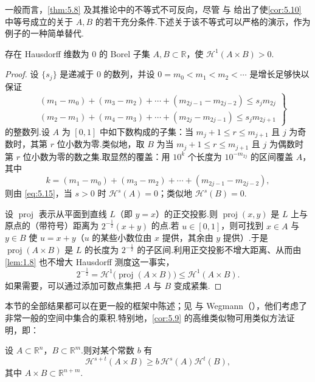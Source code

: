 一般而言，\cref{thm:5.8} 及其推论中的不等式不可反向，尽管 \textcite{besicovitchmoran1945} 与 \textcite{taylor1952} 给出了使\cref{cor:5.10} 中等号成立的关于 $A,B$ 的若干充分条件.下述关于该不等式可以严格的演示，作为 \textcite{besicovitchmoran1945} 例子的一种简单替代.

\begin{theorem}\label{thm:5.11}
存在 Hausdorff 维数为 $0$ 的 Borel 子集 $A,B\subset\mathbb{R}$，使 $\mathcal{H}^1(A\times B)>0$.
\end{theorem}

\begin{proof}
设 $\{s_j\}$ 是递减于 $0$ 的数列，并设 $0=m_0<m_1<m_2<\cdots$ 是增长足够快以保证
\begin{equation}\label{eq:5.15}
  \left.
  \begin{aligned}
    &(m_1-m_0)+(m_3-m_2)+\cdots+(m_{2j-1}-m_{2j-2})\leq s_jm_{2j}\\
    &(m_2-m_1)+(m_4-m_3)+\cdots+(m_{2j}-m_{2j-1})\leq s_jm_{2j+1}
  \end{aligned}
  \right\}
\end{equation}
的整数列.设 $A$ 为 $[0,1]$ 中如下数构成的子集：当 $m_j+1\leq r\leq m_{j+1}$ 且 $j$ 为奇数时，其第 $r$ 位小数为零.类似地，取 $B$ 为当 $m_j+1\leq r\leq m_{j+1}$ 且 $j$ 为偶数时第 $r$ 位小数为零的数之集.取显然的覆盖：用 $10^k$ 个长度为 $10^{-m_{2j}}$ 的区间覆盖 $A$，其中
\[
  k=(m_1-m_0)+(m_3-m_2)+\cdots+(m_{2j-1}-m_{2j-2}),
\]
则由 \eqref{eq:5.15}，当 $s>0$ 时 $\mathcal{H}^s(A)=0$；类似地 $\mathcal{H}^s(B)=0$.

设 $\operatorname{proj}$ 表示从平面到直线 $L$（即 $y=x$）的正交投影.则 $\operatorname{proj}(x,y)$ 是 $L$ 上与原点的（带符号）距离为 $2^{-\frac{1}{2}}(x+y)$ 的点.若 $u\in[0,1]$，则可找到 $x\in A$ 与 $y\in B$ 使 $u=x+y$（$u$ 的某些小数位由 $x$ 提供，其余由 $y$ 提供）.于是 $\operatorname{proj}(A\times B)$ 是 $L$ 的长度为 $2^{-\frac{1}{2}}$ 的子区间.利用正交投影不增大距离、从而由\cref{lem:1.8} 也不增大 Hausdorff 测度这一事实，
\[
  2^{-\frac{1}{2}}=\mathcal{H}^{1}\bigl(\operatorname{proj}(A\times B)\bigr)\leq\mathcal{H}^{1}(A\times B).
\]
如果需要，可以通过添加可数点集把 $A$ 与 $B$ 变成紧集.
\end{proof}

本节的全部结果都可以在更一般的框架中陈述；见 \textcite{larman1967a} 与 Wegmann（\citeyear{wegmann1969a,wegmann1969b,wegmann1971a}），他们考虑了非常一般的空间中集合的乘积.特别地，\cref{cor:5.9} 的高维类似物可用类似方法证明，即：

\begin{theorem}\label{thm:5.12}
设 $A\subset\mathbb{R}^n$，$B\subset\mathbb{R}^m$.则对某个常数 $b$ 有
\[
  \mathcal{H}^{s+t}(A\times B)\geq b\,\mathcal{H}^{s}(A)\mathcal{H}^{t}(B),
\]
其中 $A\times B\subset\mathbb{R}^{n+m}$.
\end{theorem}

